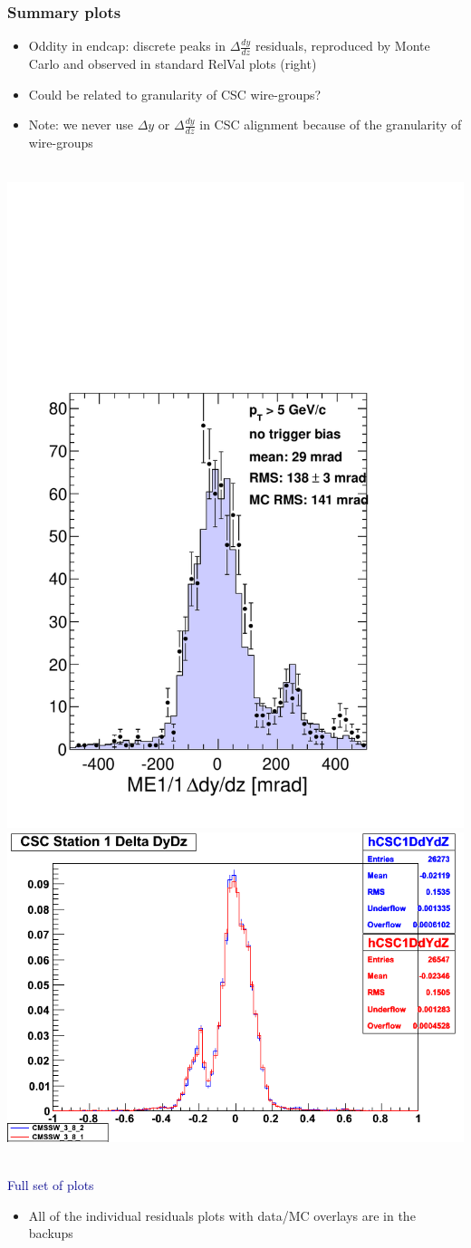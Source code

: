 \documentclass[compress]{beamer}
\begin{document}
\begin{frame}
\frametitle{Summary plots}

\begin{itemize}
\item Oddity in endcap: discrete peaks in $\Delta \frac{dy}{dz}$ residuals, reproduced by Monte Carlo and observed in standard RelVal plots (right)
\item Could be related to granularity of CSC wire-groups?
\item Note: we never use $\Delta y$ or $\Delta \frac{dy}{dz}$ in CSC alignment because of the granularity of wire-groups
\end{itemize}

\vfill
\begin{center}
\mbox{ } \hfill \includegraphics[height=3.2 cm]{me11_dYdZ.pdf} \hfill \includegraphics[height=3.2 cm]{me11_dydz_relvals.png} \hfill \mbox{ }
\end{center}

\vfill
\hspace{-0.83 cm} \textcolor{darkblue}{\Large Full set of plots}
\begin{itemize}
\item All of the individual residuals plots with data/MC overlays are in the backups
\end{itemize}
\end{frame}
\end{document}
